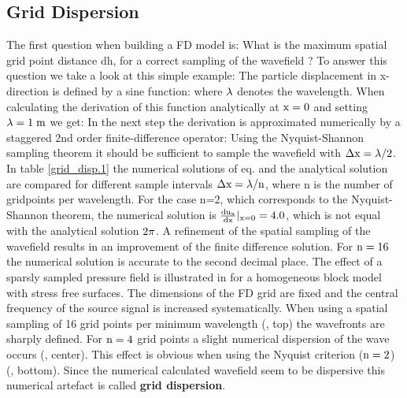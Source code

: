 \subsection{Grid Dispersion}\label{grid-dispersion}
The first question when building a FD model is: What is the maximum spatial grid point distance dh, for a correct sampling of the wavefield ? To answer this question we take a look at this simple example: The particle displacement in x-direction is defined by a sine function:
where $\rm{\lambda}$ denotes the wavelength. When calculating the derivation of this function analytically at $\rm{x=0}$ and setting $\rm{\lambda=1\;m}$ we get:
In the next step the derivation is approximated numerically by a staggered 2nd order finite-difference operator:
Using the Nyquist-Shannon sampling theorem it should be sufficient to sample the wavefield with $\rm{\Delta x = \lambda/2}$. In table \ref{grid_disp.1} the
numerical solutions of eq.  and the analytical solution  are compared for different sample intervals 
$\rm{\Delta x = \lambda /n}$, where n is the number of gridpoints per wavelength. For the case n=2, which corresponds to the Nyquist-Shannon theorem, the
numerical solution is $\rm{\frac{d u_x}{d x}|_{x=0}=4.0}$, which is not equal with the analytical solution $\rm{2 \pi}$. A refinement of the spatial
sampling of the wavefield results in an improvement of the finite difference solution. For $\rm{n=16}$ the numerical solution is accurate to the second
decimal place. The effect of a sparsly sampled pressure field is illustrated in  for a homogeneous block model with stress free surfaces. The dimensions of the FD grid are fixed
and the central frequency of the source signal is increased systematically. 
When using a spatial sampling of 16 grid points per minimum wavelength (, top) the wavefronts are sharply defined. For $\rm{n=4}$ 
grid points a slight numerical dispersion of the wave occurs (, center). This effect is obvious when using the Nyquist criterion ($\rm{n=2}$) 
(, bottom). Since the numerical calculated wavefield seem to be dispersive this numerical artefact is called {\bf{grid dispersion}}. 
